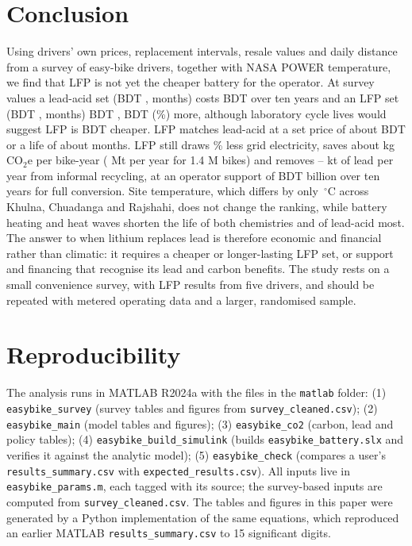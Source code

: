 \section{Conclusion}
\label{sec:concl}
Using drivers' own prices, replacement intervals, resale values and daily distance from a survey of \nSurvey{} easy-bike drivers, together with NASA POWER temperature, we find that LFP is not yet the cheaper battery for the operator. At survey values a lead-acid set (BDT \costMedLA{}, \replMedLA{} months) costs BDT \tcoLA{} over ten years and an LFP set (BDT \costMedLFP{}, \replMedLFP{} months) BDT \tcoLFP{}, BDT \gapLFP{} (\gapPct\%) more, although laboratory cycle lives would suggest LFP is BDT \litGap{} cheaper. LFP matches lead-acid at a set price of about BDT \beP{} or a life of about \beL{} months. LFP still draws \gridratio\% less grid electricity, saves about \saveBike{} kg CO$_2$e per bike-year (\fleetA{} Mt per year for 1.4 M bikes) and removes \leadLow--\leadHigh{} kt of lead per year from informal recycling, at an operator support of BDT \suppFull{} billion over ten years for full conversion. Site temperature, which differs by only \Tspread\,$^\circ$C across Khulna, Chuadanga and Rajshahi, does not change the ranking, while battery heating and heat waves shorten the life of both chemistries and of lead-acid most. The answer to when lithium replaces lead is therefore economic and financial rather than climatic: it requires a cheaper or longer-lasting LFP set, or support and financing that recognise its lead and carbon benefits. The study rests on a small convenience survey, with LFP results from five drivers, and should be repeated with metered operating data and a larger, randomised sample.

\section{Reproducibility}
\label{sec:repro}
The analysis runs in MATLAB R2024a with the files in the \texttt{matlab} folder: (1) \texttt{easybike\_survey} (survey tables and figures from \texttt{survey\_cleaned.csv}); (2) \texttt{easybike\_main} (model tables and figures); (3) \texttt{easybike\_co2} (carbon, lead and policy tables); (4) \texttt{easybike\_build\_simulink} (builds \texttt{easybike\_battery.slx} and verifies it against the analytic model); (5) \texttt{easybike\_check} (compares a user's \texttt{results\_summary.csv} with \texttt{expected\_results.csv}). All inputs live in \texttt{easybike\_params.m}, each tagged with its source; the survey-based inputs are computed from \texttt{survey\_cleaned.csv}. The tables and figures in this paper were generated by a Python implementation of the same equations, which reproduced an earlier MATLAB \texttt{results\_summary.csv} to 15 significant digits. 
